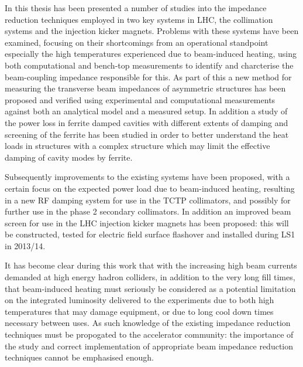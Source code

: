 In this thesis has been presented a number of studies into the impedance reduction techniques employed in two key systems in LHC, the collimation systems and the injection kicker magnets. Problems with these systems have been examined, focusing on their shortcomings from an operational standpoint especially the high temperatures experienced due to beam-induced heating, using both computational and bench-top measurements to identify and charcterise the beam-coupling impedance responsible for this. As part of this a new method for measuring the transverse beam impedances of asymmetric structures has been proposed and verified using experimental and computational measurements against both an analytical model and a measured setup. In addition a study of the power loss in ferrite damped cavities with different extents of damping and screening of the ferrite has been studied in order to better understand the heat loads in structures with a complex structure which may limit the effective damping of cavity modes by ferrite.

Subsequently improvements to the existing systems have been proposed, with a certain focus on the expected power load due to beam-induced heating, resulting in a new RF damping system for use in the TCTP collimators, and possibly for further use in the phase 2 secondary collimators. In addition an improved beam screen for use in the LHC injection kicker magnets has been proposed: this will be constructed, tested for electric field surface flashover and installed during LS1 in 2013/14.

It has become clear during this work that with the increasing high beam currents demanded at high energy hadron colliders, in addition to the very long fill times, that beam-induced heating must seriously be considered as a potential limitation on the integrated luminosity delivered to the experiments due to both high temperatures that may damage equipment, or due to long cool down times necessary between uses. As such knowledge of the existing impedance reduction techniques must be propogated to the accelerator community: the importance of the study and correct implementation of appropriate beam impedance reduction techniques cannot be emphasised enough.